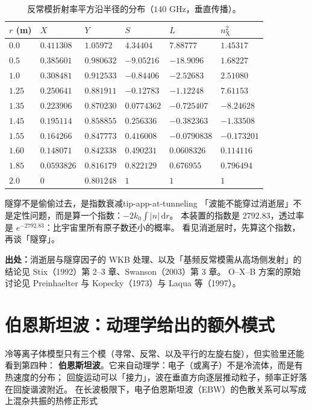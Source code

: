 \begin{table}[htbp]
\centering
\small
\caption{反常模折射率平方沿半径的分布（$140$ GHz，垂直传播）。}
\label{tab:app-at-tunnel}
\begin{tabular}{p{2.2cm}p{2.2cm}p{2.2cm}p{2.2cm}p{2.2cm}p{2.2cm}}
\hline
$r$ (m) & $X$ & $Y$ & $S$ & $L$ & $n_\mathrm{X}^2$ \\
\hline
$0.0$ & $0.411308$ & $1.05972$ & $4.34404$ & $7.88777$ & $1.45317$ \\
$0.5$ & $0.385601$ & $0.980632$ & $-9.05216$ & $-18.9096$ & $1.68227$ \\
$1.0$ & $0.308481$ & $0.912533$ & $-0.84406$ & $-2.52683$ & $2.51080$ \\
$1.25$ & $0.250641$ & $0.881911$ & $-0.12783$ & $-1.12248$ & $7.61153$ \\
$1.35$ & $0.223906$ & $0.870230$ & $0.0774362$ & $-0.725407$ & $-8.24628$ \\
$1.45$ & $0.195114$ & $0.858855$ & $0.256336$ & $-0.382363$ & $-1.33508$ \\
$1.55$ & $0.164266$ & $0.847773$ & $0.416008$ & $-0.0790838$ & $-0.173201$ \\
$1.60$ & $0.148071$ & $0.842338$ & $0.490231$ & $0.0608326$ & $0.114116$ \\
$1.85$ & $0.0593826$ & $0.816179$ & $0.822129$ & $0.676955$ & $0.796494$ \\
$2.0$ & $0$ & $0.801248$ & $1$ & $1$ & $1$ \\
\hline
\end{tabular}
\end{table}

\begin{tip}{隧穿不是偷偷过去，是指数衰减}{tip-app-at-tunneling}
「波能不能穿过消逝层」不是定性问题，而是算一个指数：$-2k_0\int|n|\,\mathrm{d}r$。
本装置的指数是 $2792.83$，透过率是 $e^{-2792.83}$：比宇宙里所有原子数还小的概率。
看见消逝层时，先算这个指数，再谈「隧穿」。
\end{tip}

{\footnotesize
\textbf{出处：}消逝层与隧穿因子的 WKB 处理、以及「基频反常模需从高场侧发射」的结论见
Stix（1992）第 2--3 章、Swanson（2003）第 3 章。
O--X--B 方案的原始讨论见 Preinhaelter 与
Kopecky（1973）与 Laqua 等（1997）。
\section{伯恩斯坦波：动理学给出的额外模式}
\label{sec:app-at-bernstein}
}

冷等离子体模型只有三个模（寻常、反常、以及平行的左旋右旋），但实验里还能看到第四种：
\textbf{伯恩斯坦波}。它来自动理学：电子（或离子）不是冷流体，而是有热速度的分布；
回旋运动可以「接力」，波在垂直方向逐层推动粒子，频率正好落在回旋谐波附近。
在长波极限下，电子伯恩斯坦波（EBW）的色散关系可以写成上混杂共振的热修正形式

